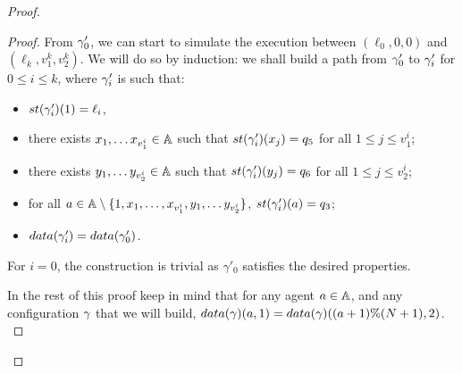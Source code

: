 \documentclass[a4paper,UKenglish,cleveref, autoref, thm-restate]{lipics-v2021}
\begin{document}
\begin{proof}
\begin{proof}
		From $\gamma'_0$, we can start to simulate the execution between $(\ell_0, 0, 0)$ and $(\ell_k, v_1^k , v_2^k )$. We will do so by induction: we shall build a path from $\gamma'_0$ to $\gamma'_i$ for $0\leq i\leq k$, where $\gamma'_i$ is such that:  
		\begin{itemize}
			\item $\st{\config'_i}(1) = \ell_i$,
			\item there exists $x_1, \dots x_{v_1^i} \in \mathbb{A}$ such that $\st{\config'_i}(x_j) = q_5$ for all $1 \leq j \leq v_1^i$;
			\item there exists $y_1, \dots y_{v_2^i} \in \mathbb{A}$ such that $\st{\config'_i}(y_j) = q_6$ for all $1 \leq j \leq v_2^i$;
			\item for all $a \in \mathbb{A} \setminus \{1, x_1, \dots, x_{v_1^i}, y_1, \dots y_{v_2^i}\}$, $\st{\config'_i}(a) = q_3$;
			\item $\data{\config'_i} = \data{\config'_0}$.
		\end{itemize} 
	For $i =0$, the construction is trivial as $\gamma'_0$ satisfies the desired properties.
	
		
	In the rest of this proof keep in mind that for any agent $a \in \mathbb{A}$, and any configuration $\gamma$ that we will build, $\data{\config}(a,1) = \data{\config}((a+1)\%(N+1),2)$.\\
	

\end{proof}
\end{proof}
\end{document}
